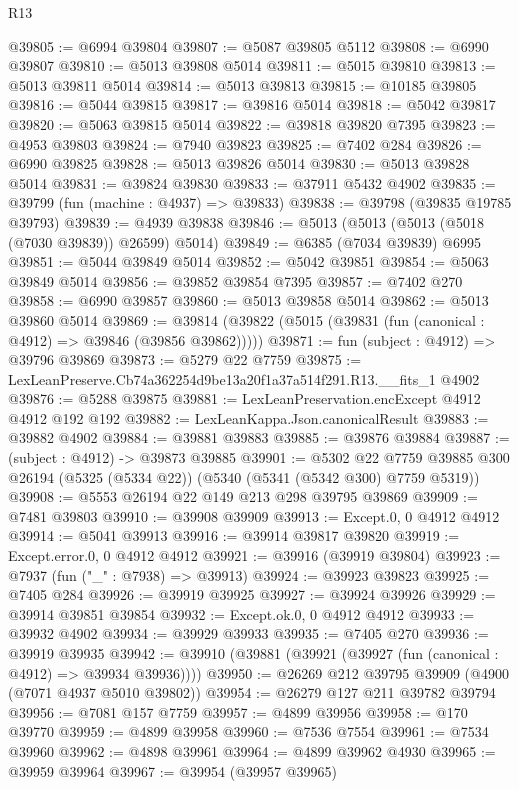\begin{lexlean}{R13}
\begin{coremodule}
@39805 := @6994 @39804
@39807 := @5087 @39805 @5112
@39808 := @6990 @39807
@39810 := @5013 @39808 @5014
@39811 := @5015 @39810
@39813 := @5013 @39811 @5014
@39814 := @5013 @39813
@39815 := @10185 @39805
@39816 := @5044 @39815
@39817 := @39816 @5014
@39818 := @5042 @39817
@39820 := @5063 @39815 @5014
@39822 := @39818 @39820 @7395
@39823 := @4953 @39803
@39824 := @7940 @39823
@39825 := @7402 @284
@39826 := @6990 @39825
@39828 := @5013 @39826 @5014
@39830 := @5013 @39828 @5014
@39831 := @39824 @39830
@39833 := @37911 @5432 @4902
@39835 := @39799 (fun (machine : @4937) => @39833)
@39838 := @39798 (@39835 @19785 @39793)
@39839 := @4939 @39838
@39846 := @5013 (@5013 (@5013 (@5018 (@7030 @39839)) @26599) @5014)
@39849 := @6385 (@7034 @39839) @6995
@39851 := @5044 @39849 @5014
@39852 := @5042 @39851
@39854 := @5063 @39849 @5014
@39856 := @39852 @39854 @7395
@39857 := @7402 @270
@39858 := @6990 @39857
@39860 := @5013 @39858 @5014
@39862 := @5013 @39860 @5014
@39869 := @39814 (@39822 (@5015 (@39831 (fun (canonical : @4912) => @39846 (@39856 @39862)))))
@39871 := fun (subject : @4912) => @39796 @39869
@39873 := @5279 @22 @7759
@39875 := LexLeanPreserve.Cb74a362254d9be13a20f1a37a514f291.R13.__fits_1 @4902
@39876 := @5288 @39875
@39881 := LexLeanPreservation.encExcept @4912 @4912 @192 @192
@39882 := LexLeanKappa.Json.canonicalResult
@39883 := @39882 @4902
@39884 := @39881 @39883
@39885 := @39876 @39884
@39887 := (subject : @4912) -> @39873 @39885
@39901 := @5302
    @22
    @7759
    @39885
    @300
    @26194
    (@5325 (@5334 @22))
    (@5340 (@5341 (@5342 @300) @7759 @5319))
@39908 := @5553 @26194 @22 @149 @213 @298 @39795 @39869
@39909 := @7481 @39803
@39910 := @39908 @39909
@39913 := Except.{0, 0} @4912 @4912
@39914 := @5041 @39913
@39916 := @39914 @39817 @39820
@39919 := Except.error.{0, 0} @4912 @4912
@39921 := @39916 (@39919 @39804)
@39923 := @7937 (fun ("_" : @7938) => @39913)
@39924 := @39923 @39823
@39925 := @7405 @284
@39926 := @39919 @39925
@39927 := @39924 @39926
@39929 := @39914 @39851 @39854
@39932 := Except.ok.{0, 0} @4912 @4912
@39933 := @39932 @4902
@39934 := @39929 @39933
@39935 := @7405 @270
@39936 := @39919 @39935
@39942 := @39910 (@39881 (@39921 (@39927 (fun (canonical : @4912) => @39934 @39936))))
@39950 := @26269 @212 @39795 @39909 (@4900 (@7071 @4937 @5010 @39802))
@39954 := @26279 @127 @211 @39782 @39794
@39956 := @7081 @157 @7759
@39957 := @4899 @39956
@39958 := @170 @39770
@39959 := @4899 @39958
@39960 := @7536 @7554
@39961 := @7534 @39960
@39962 := @4898 @39961
@39964 := @4899 @39962 @4930
@39965 := @39959 @39964
@39967 := @39954 (@39957 @39965)

\end{coremodule}
\end{lexlean}
